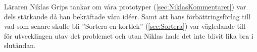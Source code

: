 


\textcolor{turkos}{Läraren Niklas Grips tankar om våra prototyper (\ref{sec:NiklasKommentarer}) var dels stärkande då han bekräftade våra idéer. Samt att hans förbättringsförlag till vad som senare skulle bli ''Sortera en kortlek'' (\ref{sec:Sortera}) var vägledande till för utvecklingen utav det problemet och utan Niklas hade det inte blivit lika bra i slutändan.}